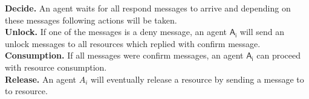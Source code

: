 \noindent \textbf{Decide.} An agent waits for all respond messages to arrive and depending on these messages following actions will be taken. \\

\textbf{Unlock.} If one of the messages is a deny message, an agent $\mathsf{A_i}$ will send an unlock messages to all resources which replied with confirm message. \\

\textbf{Consumption.} If all messages were confirm messages, an agent $\mathsf{A_i}$ can proceed with resource consumption.\\

\noindent \textbf{Release.} An agent $A_i$ will eventually release a resource by sending a message to to resource. \vspace{1cm} \\







